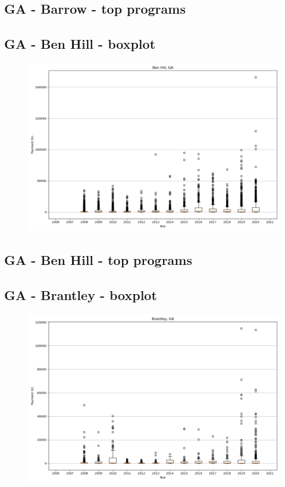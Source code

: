 \subsection*{GA - Barrow - top programs}

\newpage
\subsection*{GA - Ben Hill - boxplot}
\begin{figure}[h]
\centering
\includegraphics[width=7in]{../output/boxplots/counties/Ben Hill-GA_boxplot.png}
\end{figure}


\subsection*{GA - Ben Hill - top programs}

\newpage
\subsection*{GA - Brantley - boxplot}
\begin{figure}[h]
\centering
\includegraphics[width=7in]{../output/boxplots/counties/Brantley-GA_boxplot.png}
\end{figure}


